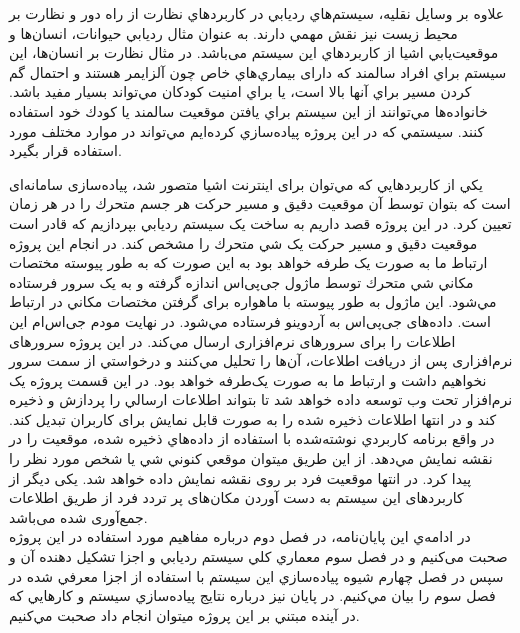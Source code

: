 علاوه بر وسايل نقليه، سيستم‌هاي رديابي در كاربردهاي نظارت از راه دور و نظارت بر محیط زیست نيز نقش مهمي دارند. به عنوان مثال رديابي حيوانات، انسان‌ها و موقعيت‌يابي اشيا از كاربردهاي اين سيستم می‌باشد. در مثال نظارت بر انسان‌ها، اين سيستم براي افراد سالمند كه دارای بيماري‌هاي خاص چون آلزايمر هستند و احتمال گم كردن مسير براي آنها بالا است، يا براي امنيت كودكان مي‌تواند بسيار مفيد باشد. خانواده‌ها مي‌توانند از اين سيستم براي يافتن موقعيت سالمند يا كودك خود استفاده كنند\cite{Saranya2013}. سيستمي كه در اين پروژه پياده‌سازي كرده‌ايم مي‌تواند در موارد مختلف مورد استفاده قرار بگيرد.


يکي از كاربردهايي كه مي‌توان برای اينترنت اشيا متصور شد، پياده‌سازی سامانه‌ای است كه بتوان توسط آن موقعيت دقيق و مسير حركت هر جسم متحرك را در هر زمان تعيين كرد. در اين پروژه قصد داريم به ساخت يک سيستم رديابي بپردازيم كه قادر است موقعيت دقيق و مسير حركت يک شي متحرك را مشخص كند. در انجام اين پروژه ارتباط ما به صورت يک طرفه خواهد بود به اين صورت كه به طور پيوسته مختصات مکاني شي متحرك توسط ماژول جی‌پی‌اس اندازه گرفته و به يک سرور فرستاده مي‌شود. اين ماژول به طور پيوسته با ماهواره برای گرفتن مختصات مکاني در ارتباط است. داده‌های جی‌پی‌اس به آردوينو فرستاده مي‌شود. در نهايت مودم جی‌اس‌ام  اين اطلاعات را برای سرورهای نرم‌افزاری ارسال مي‌كند. در اين پروژه سرورهای نرم‌افزاری پس از دريافت اطلاعات، آن‌ها را تحليل مي‌كنند و درخواستي از سمت سرور نخواهيم داشت و ارتباط ما به صورت يک‌طرفه خواهد بود. در اين قسمت پروژه يک نرم‌افزار تحت وب توسعه داده خواهد شد تا
بتواند اطلاعات ارسالي را پردازش و ذخيره كند و در انتها اطلاعات ذخيره شده را به صورت قابل نمايش برای كاربران تبديل كند. در واقع برنامه كاربردي نوشته‌شده با استفاده از داده‌هاي ذخیره شده، موقعيت را در نقشه نمايش مي‌دهد. از اين طريق ميتوان موقعي كنوني شي يا شخص مورد نظر را پيدا كرد. در انتها موقعیت فرد بر روی نقشه نمایش داده خواهد شد. یکی دیگر از کاربردهای این سیستم به دست آوردن مکان‌های پر تردد فرد از طریق اطلاعات جمع‌آوری شده می‌باشد.\\



در ادامه‌ي اين پايان‌نامه، در فصل دوم درباره مفاهیم مورد استفاده در این پروژه صحبت می‌کنیم و در فصل سوم معماري كلي سيستم رديابي و اجزا تشكيل دهنده آن و سپس در فصل چهارم شيوه پياده‌سازي اين سيستم با استفاده از اجزا معرفي شده در فصل سوم را بيان مي‌كنيم. در پايان نيز درباره نتايج پياده‌سازي سيستم و كارهايي كه در آينده مبتني بر اين پروژه ميتوان انجام داد صحبت مي‌كنيم.


   
